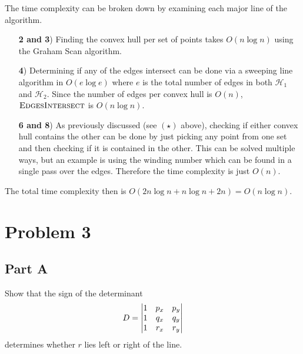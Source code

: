 \documentclass{eeleyes}
\begin{document}
\noindent
The time complexity can be broken down by examining each major line of the algorithm.

\begin{enumerate}
    \item[\textbf{2 and 3})] 
        Finding the convex hull per set of points takes $O(n \log n)$ using the Graham Scan algorithm.
    \item[\textbf{4})] 
        Determining if any of the edges intersect can be done via a sweeping line algorithm in $O(e \log e)$ where $e$ is the total number of edges in both $\mathcal{H}_1$ and $\mathcal{H}_2$. Since the number of edges per convex hull is $O(n)$, $\textsc{EdgesIntersect}$ is $O(n \log n)$.
    \item[\textbf{6 and 8})]
        As previously discussed (see $(\star)$ above), checking if either convex hull contains the other can be done by just picking any point from one set and then checking if it is contained in the other. This can be solved multiple ways, but an example is using the winding number which can be found in a single pass over the edges. Therefore the time complexity is just $O(n)$.
\end{enumerate}

\noindent
The total time complexity then is $O(2 n \log n + n \log n + 2n) = O(n \log n)$.

\section*{Problem 3}
\begin{problem}
    \subsection*{Part A}
    Show that the sign of the determinant
    \[
        D = \mqty|
            1 & p_x & p_y \\
            1 & q_x & q_y \\
            1 & r_x & r_y
        |
    \]
    determines whether $r$ lies left or right of the line.
\end{problem}
\end{document}
